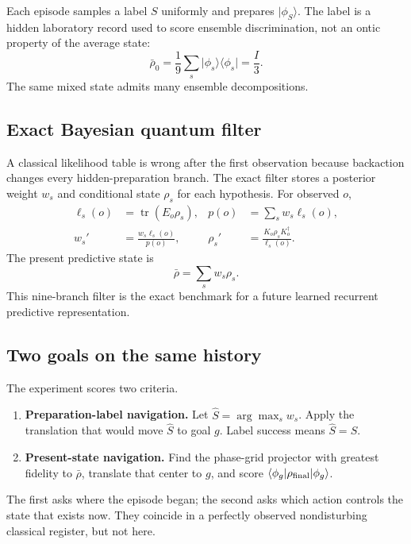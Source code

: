 \documentclass[11pt]{article}
\theoremstyle{definition}\newtheorem{definition}[theorem]{Definition}
\theoremstyle{remark}\newtheorem{remark}[theorem]{Remark}
\newcommand{\tr}{\operatorname{tr}}
\newcommand{\ket}[1]{\lvert #1\rangle}
\newcommand{\bra}[1]{\langle #1\rvert}
\newcommand{\proj}[1]{\lvert #1\rangle\!\langle #1\rvert}
\begin{document}
Each episode samples a label \(S\) uniformly and prepares \(\ket{\phi_S}\).
The label is a hidden laboratory record used to score ensemble discrimination,
not an ontic property of the average state:
\[
\bar\rho_0=\frac19\sum_s\proj{\phi_s}=\frac I3.
\]
The same mixed state admits many ensemble decompositions.

\subsection{Exact Bayesian quantum filter}

A classical likelihood table is wrong after the first observation because
backaction changes every hidden-preparation branch. The exact filter stores a
posterior weight \(w_s\) and conditional state \(\rho_s\) for each hypothesis.
For observed \(o\),
\begin{align}
\ell_s(o)&=\tr(E_o\rho_s),&
p(o)&=\sum_sw_s\ell_s(o),\\
w_s'&=\frac{w_s\ell_s(o)}{p(o)},&
\rho_s'&=\frac{K_o\rho_sK_o^\dagger}{\ell_s(o)}.
\label{eq:filter}
\end{align}
The present predictive state is
\begin{equation}
\bar\rho=\sum_sw_s\rho_s.
\label{eq:predictive}
\end{equation}
This nine-branch filter is the exact benchmark for a future learned recurrent
predictive representation.

\subsection{Two goals on the same history}

The experiment scores two criteria.
\begin{enumerate}[leftmargin=2em]
\item \textbf{Preparation-label navigation.} Let
\(\hat S=\arg\max_sw_s\). Apply the translation that would move \(\hat S\) to
goal \(g\). Label success means \(\hat S=S\).
\item \textbf{Present-state navigation.} Find the phase-grid projector with
greatest fidelity to \(\bar\rho\), translate that center to \(g\), and score
\(\bra{\phi_g}\rho_{\rm final}\ket{\phi_g}\).
\end{enumerate}
The first asks where the episode began; the second asks which action controls
the state that exists now. They coincide in a perfectly observed
nondisturbing classical register, but not here.
\end{document}
